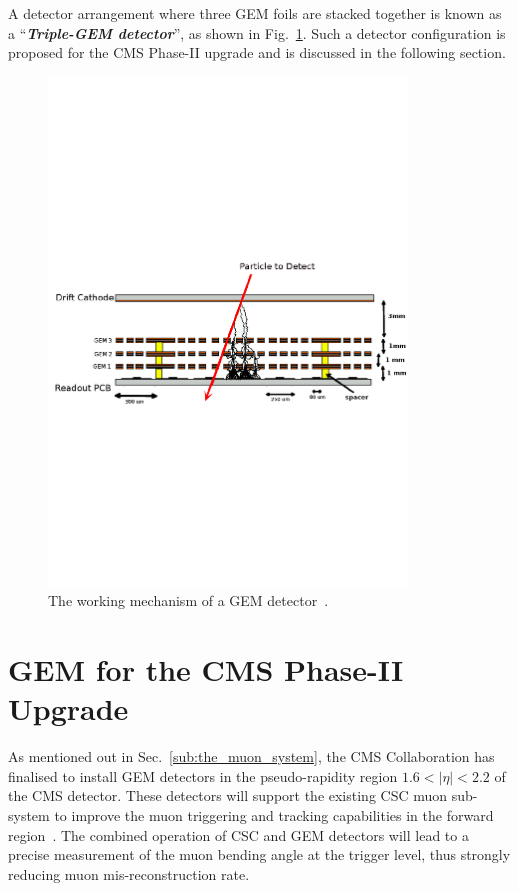 A detector arrangement where three GEM foils are stacked together is known as a ``\textit{\textbf{Triple-GEM detector}}'', as shown in Fig.~\ref{fig:gemgaps}. Such a detector configuration is proposed for the CMS Phase-II upgrade and is discussed in the following section.
\begin{figure}[!htbp]
    \begin{center}
        \includegraphics[width=0.85\textwidth]{figures/GEM/triple_gem.pdf}
        \caption{The working mechanism of a GEM detector~\cite{Abbaneo2014}.}
        \label{fig:gemgaps}
    \end{center}
\end{figure} 


\section{GEM for the CMS Phase-II Upgrade} %
\label{sec:gem_for_cms}
As mentioned out in Sec.~\ref{sub:the_muon_system},  the CMS Collaboration has finalised to install GEM detectors in the pseudo-rapidity region $1.6 < |\eta| < 2.2$ of the CMS detector.
These detectors will support the existing CSC muon sub-system to improve the muon triggering and tracking capabilities in the forward region~\cite{Colaleo:2021453}.
The combined operation of CSC and GEM detectors will lead to a precise measurement of the muon bending angle at the trigger level, thus strongly reducing muon mis-reconstruction rate.

